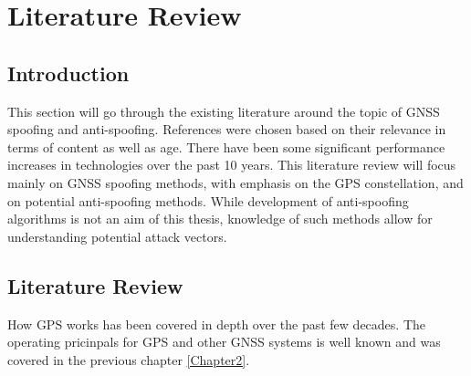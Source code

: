 
\chapter{Literature Review} %

\label{Chapter3} %


\section{Introduction}
This section will go through the existing literature around the topic of GNSS spoofing and anti-spoofing. References were chosen based on their relevance in terms of
content as well as age. There have been some significant performance increases in technologies over the past 10 years.
This literature review will focus mainly on GNSS spoofing methods, with emphasis on the GPS constellation, and on potential anti-spoofing methods. While development of
anti-spoofing algorithms is not an aim of this thesis, knowledge of such methods allow for understanding potential attack vectors.

\section{Literature Review}
How GPS works has been covered in depth over the past few decades. The operating pricinpals for GPS and other GNSS systems is well known and was covered in the previous
chapter \ref{Chapter2}. 

